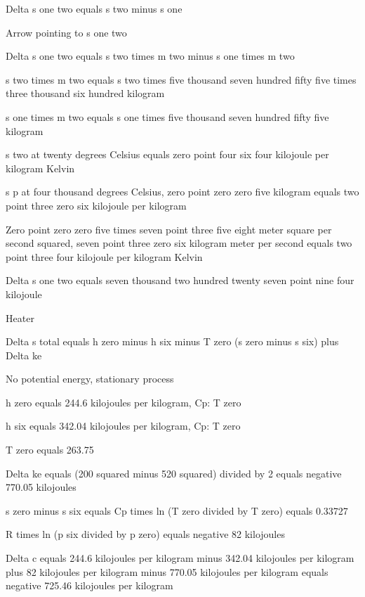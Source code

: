 Delta s one two equals s two minus s one

Arrow pointing to s one two

Delta s one two equals s two times m two minus s one times m two

s two times m two equals s two times five thousand seven hundred fifty five times three thousand six hundred kilogram

s one times m two equals s one times five thousand seven hundred fifty five kilogram

s two at twenty degrees Celsius equals zero point four six four kilojoule per kilogram Kelvin

s p at four thousand degrees Celsius, zero point zero zero five kilogram equals two point three zero six kilojoule per kilogram

Zero point zero zero five times seven point three five eight meter square per second squared, seven point three zero six kilogram meter per second equals two point three four kilojoule per kilogram Kelvin

Delta s one two equals seven thousand two hundred twenty seven point nine four kilojoule

Heater

Delta s total equals h zero minus h six minus T zero (s zero minus s six) plus Delta ke

No potential energy, stationary process

h zero equals 244.6 kilojoules per kilogram, Cp: T zero

h six equals 342.04 kilojoules per kilogram, Cp: T zero

T zero equals 263.75

Delta ke equals (200 squared minus 520 squared) divided by 2 equals negative 770.05 kilojoules

s zero minus s six equals Cp times ln (T zero divided by T zero) equals 0.33727

R times ln (p six divided by p zero) equals negative 82 kilojoules

Delta c equals 244.6 kilojoules per kilogram minus 342.04 kilojoules per kilogram plus 82 kilojoules per kilogram minus 770.05 kilojoules per kilogram equals negative 725.46 kilojoules per kilogram